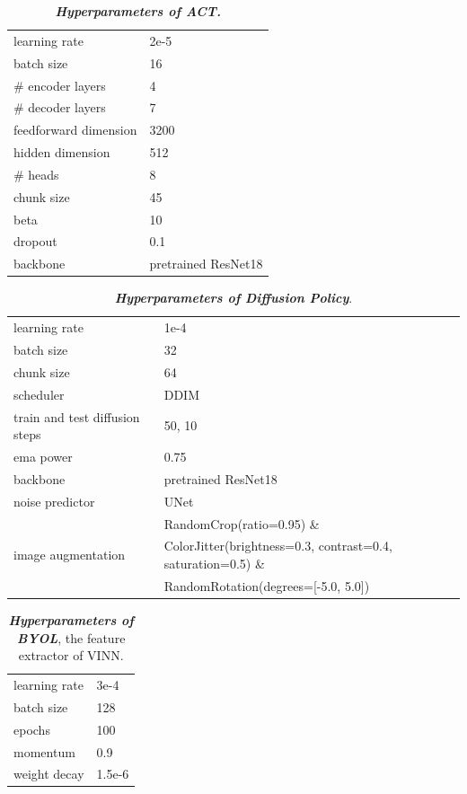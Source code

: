 \documentclass[11pt, a4paper, logo, twocolumn]{stanford}
\begin{document}
\begin{table}[tbh!]
\centering
\setlength{\tabcolsep}{32pt}
\begin{tabular}{ll}
\toprule
learning rate & 2e-5 \\
batch size & 16 \\
\# encoder layers & 4 \\
\# decoder layers & 7 \\
feedforward dimension & 3200 \\
hidden dimension & 512 \\
\# heads & 8 \\
chunk size & 45 \\
beta & 10 \\
dropout & 0.1 \\
backbone & pretrained ResNet18\cite{He2015DeepRL} \\
\bottomrule
\end{tabular}
\caption{\small \textbf{\textit{Hyperparameters of ACT.}}}
\label{tab:hparam_act}
\end{table}


\begin{table}[tbh!]
\centering
\begin{tabular}{ll}
\toprule
learning rate & 1e-4 \\
batch size & 32 \\
chunk size & 64 \\
scheduler & DDIM\cite{song2020denoising} \\
train and test diffusion steps & 50, 10 \\
ema power & 0.75 \\
backbone & pretrained ResNet18\cite{He2015DeepRL} \\
noise predictor & UNet\cite{Ronneberger2015UNetCN} \\
\multirow{3}{*}{image augmentation} & RandomCrop(ratio=0.95) \& \\
& ColorJitter(brightness=0.3, contrast=0.4, saturation=0.5) \& \\
& RandomRotation(degrees=[-5.0, 5.0]) \\
\bottomrule
\end{tabular}
\caption{\small \textit{\textbf{Hyperparameters of Diffusion Policy}}.}
\label{tab:hparam_diffusion}
\end{table}


\begin{table}[tbh!]
\centering
\setlength{\tabcolsep}{32pt}
\begin{tabular}{ll}
\toprule
learning rate & 3e-4 \\
batch size & 128\\
epochs & 100 \\
momentum & 0.9 \\
weight decay & 1.5e-6 \\

\bottomrule
\end{tabular}
\caption{\small \textbf{\textit{Hyperparameters of BYOL}}, the feature extractor of VINN.}
\label{tab:hparam_byol}
\end{table}
\end{document}
